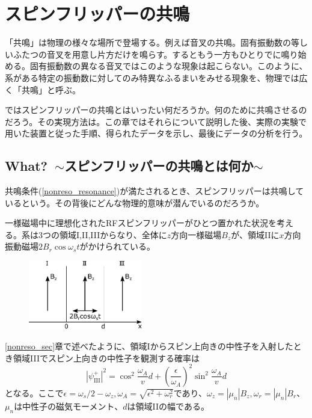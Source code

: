 \section{スピンフリッパーの共鳴}\label{resonance_sec}

「共鳴」は物理の様々な場所で登場する。例えば音叉の共鳴。固有振動数の等しいふたつの音叉を用意し片方だけを鳴らす。するともう一方もひとりでに鳴り始める。固有振動数の異なる音叉ではこのような現象は起こらない。このように、系がある特定の振動数に対してのみ特異なふるまいをみせる現象を、物理では広く「共鳴」と呼ぶ。

ではスピンフリッパーの共鳴とはいったい何だろうか。何のために共鳴させるのだろう。その実現方法は。この章ではそれらについて説明した後、実際の実験で用いた装置と従った手順、得られたデータを示し、最後にデータの分析を行う。

\subsection{What?\ $\sim$スピンフリッパーの共鳴とは何か$\sim$} \label{Resonance_what}
共鳴条件(\ref{nonreso_resonance})が満たされるとき、スピンフリッパーは共鳴しているという。その背後にどんな物理的意味が潜んでいるのだろうか。

一様磁場中に理想化されたRFスピンフリッパーがひとつ置かれた状況を考える。系は3つの領域I,II,IIIからなり、全体に$z$方向一様磁場$B_z$が、領域IIに$x$方向振動磁場$2B_r \cos \omega_s t$がかけられている。
\begin{figure}[h]
\centering
\includegraphics[height=3cm]{resonance/whatwhyhow/Resonance_what_setting.pdf}
\end{figure}

\ref{nonreso_sec}章で述べたように、領域Iからスピン上向きの中性子を入射したとき領域IIIでスピン上向きの中性子を観測する確率は
\begin{equation}
|\psi_{\mathrm{III}}^+|^2=\cos^2 \frac{\omega_A}{v}d+\left(\frac{\epsilon}{\omega_A}\right)^2\sin^2\frac{\omega_A}{v}d \label{Resonance_flip}
\end{equation}
となる。ここで$\epsilon=\omega_s/2-\omega_z,\omega_A=\sqrt{\epsilon^2+\omega_r^2}$であり、$\omega_z=|\mu_n|B_z,\omega_r=|\mu_n|B_r$、$\mu_n$は中性子の磁気モーメント、$d$は領域IIの幅である。

